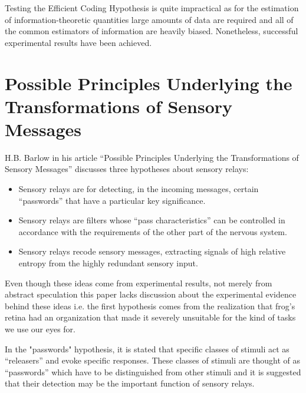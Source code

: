 \documentclass[twoside]{article}
\begin{document}
\begin{multicols}{2}
Testing the Efficient Coding Hypothesis is quite impractical as for the estimation of information-theoretic quantities large amounts of data are required and all of the common estimators of information are heavily biased. Nonetheless, successful experimental results have been achieved.







\section{Possible Principles Underlying the Transformations of Sensory Messages}

H.B. Barlow in his article “Possible Principles Underlying the Transformations of Sensory Messages” discusses three hypotheses about sensory relays:
\begin{itemize}
	\item Sensory relays are for detecting, in the incoming messages, certain ``passwords'' that have a particular key significance.
	\item Sensory relays are filters whose “pass characteristics” can be controlled in accordance with the requirements of the other part of the nervous system.
	\item Sensory relays recode sensory messages, extracting signals of high relative entropy from the highly redundant sensory input.
\end{itemize}

Even though these ideas come from experimental results, not merely from abstract speculation this paper lacks discussion about the experimental evidence behind these ideas i.e. the first hypothesis comes from the realization that frog’s retina had an organization that made it severely unsuitable for the kind of tasks we use our eyes for. 

In the "passwords" hypothesis, it is stated that specific classes of stimuli act as ``releasers'' and evoke specific responses. These classes of stimuli are thought of as “passwords” which have to be distinguished from other stimuli and it is suggested that their detection may be the important function of sensory relays. 


\end{multicols}
\end{document}
